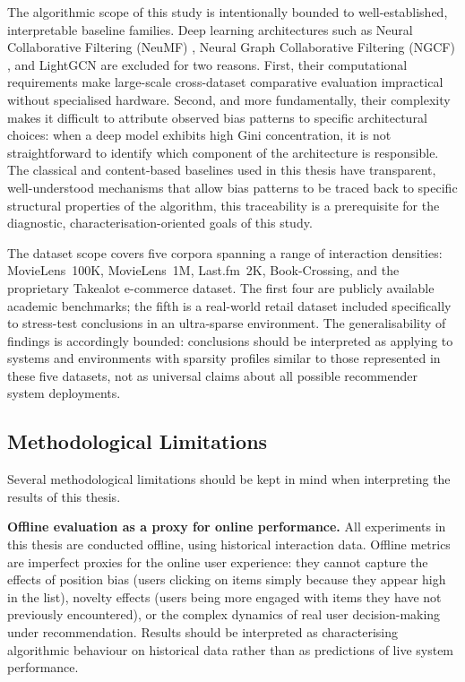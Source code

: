 \documentclass[11pt,a4paper]{report}
\begin{document}
The algorithmic scope of this study is intentionally bounded to well-established, interpretable baseline families. Deep learning architectures such as Neural Collaborative Filtering (NeuMF) \citep{he2017ncf}, Neural Graph Collaborative Filtering (NGCF) \citep{wang2019ngcf}, and LightGCN \citep{he2020lightgcn} are excluded for two reasons. First, their computational requirements make large-scale cross-dataset comparative evaluation impractical without specialised hardware. Second, and more fundamentally, their complexity makes it difficult to attribute observed bias patterns to specific architectural choices: when a deep model exhibits high Gini concentration, it is not straightforward to identify which component of the architecture is responsible. The classical and content-based baselines used in this thesis have transparent, well-understood mechanisms that allow bias patterns to be traced back to specific structural properties of the algorithm, this traceability is a prerequisite for the diagnostic, characterisation-oriented goals of this study.

The dataset scope covers five corpora spanning a range of interaction densities: MovieLens~100K, MovieLens~1M, Last.fm~2K, Book-Crossing, and the proprietary Takealot e-commerce dataset. The first four are publicly available academic benchmarks; the fifth is a real-world retail dataset included specifically to stress-test conclusions in an ultra-sparse environment. The generalisability of findings is accordingly bounded: conclusions should be interpreted as applying to systems and environments with sparsity profiles similar to those represented in these five datasets, not as universal claims about all possible recommender system deployments.

\subsection{Methodological Limitations}

Several methodological limitations should be kept in mind when interpreting the results of this thesis.

\textbf{Offline evaluation as a proxy for online performance.} All experiments in this thesis are conducted offline, using historical interaction data. Offline metrics are imperfect proxies for the online user experience: they cannot capture the effects of position bias (users clicking on items simply because they appear high in the list), novelty effects (users being more engaged with items they have not previously encountered), or the complex dynamics of real user decision-making under recommendation. Results should be interpreted as characterising algorithmic behaviour on historical data rather than as predictions of live system performance.
\end{document}
